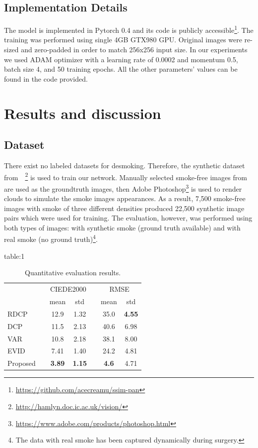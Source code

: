 \documentclass[pmlr]{jmlr}
\begin{document}
\subsection{Implementation Details}
The model is implemented in Pytorch 0.4 and its code is publicly accessible\footnote{ \url{https://github.com/acecreamu/ssim-pan}}. The training was performed using single 4GB GTX980 GPU. Original images were re-sized and zero-padded in order to match 256x256 input size. In our experiments we used ADAM optimizer with a learning rate of 0.0002 and momentum 0.5, batch size 4, and 50 training epochs. All the other parameters' values can be found in the code provided.

\section{Results and discussion}
\label{sec:results}

\subsection{Dataset}
There exist no labeled datasets for desmoking. Therefore, the synthetic dataset from~\citep{wang2019multiscale}~\footnote{ \url{http://hamlyn.doc.ic.ac.uk/vision/}} is used to train our network. Manually selected smoke-free images from~\citep{chen2018unsupervised} are used as the groundtruth images, then Adobe Photoshop\footnote{ \url{https://www.adobe.com/products/photoshop.html}} is used to render clouds to simulate the smoke images appearances. As a result, 7,500 smoke-free images with smoke of three different densities produced 22,500 synthetic image pairs which were used for training. The evaluation, however, was performed using both types of images: with synthetic smoke (ground truth available) and with real smoke (no ground truth)\footnote{ The data with real smoke has been captured dynamically during surgery.}.

\begin{table}[b!]
\floatconts
{table:1}
{\caption{Quantitative evaluation results.}}
{
 \begin{tabular}{l p{1cm} c c p{1cm} c c} 
 \hline\hline
&  \multicolumn{1}{c}{} & \multicolumn{2}{c}{CIEDE2000} & \multicolumn{1}{c}{} & \multicolumn{2}{c}{RMSE} \\ 
& & mean & std & & mean & std \\ 
 \hline
 RDCP~\citep{tchakaa2017chromaticity} & & 12.9 & 1.32 & & 35.0 & \textbf{4.55} \\ 
 DCP~\citep{he2011single}  & & 11.5 & 2.13 & & 40.6 & 6.98 \\
 VAR~\citep{wang2018variational}  & & 10.8 & 2.18 & & 38.1 & 8.00 \\
 EVID~\citep{galdran2015enhanced} & & 7.41 & 1.40 & & 24.2 & 4.81 \\
 Proposed & & \textbf{3.89} & \textbf{1.15} & &\textbf{4.6} & 4.71 \\ 
 \hline\hline
 \end{tabular}
 }
\end{table}
\end{document}

